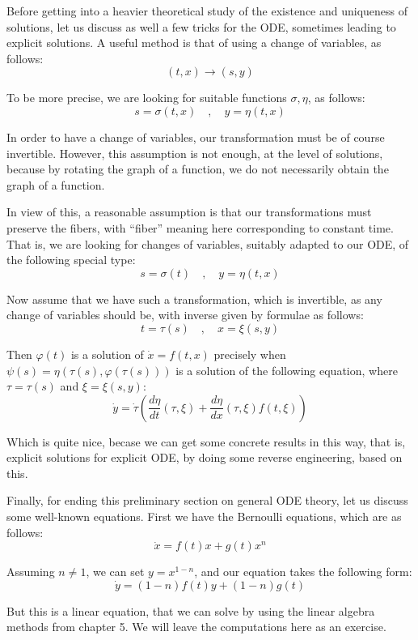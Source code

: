 \documentclass[12pt]{amsbook}
\begin{document}
Before getting into a heavier theoretical study of the existence and uniqueness of solutions, let us discuss as well a few tricks for the ODE, sometimes leading to explicit solutions. A useful method is that of using a change of variables, as follows:
$$(t,x)\to (s,y)$$

To be more precise, we are looking for suitable functions $\sigma,\eta$, as follows:
$$s=\sigma(t,x)\quad,\quad y=\eta(t,x)$$

In order to have a change of variables, our transformation must be of course invertible. However, this assumption is not enough, at the level of solutions, because by rotating the graph of a function, we do not necessarily obtain the graph of a function.

\bigskip

In view of this, a reasonable assumption is that our transformations must preserve the fibers, with ``fiber'' meaning here corresponding to constant time. That is, we are looking for changes of variables, suitably adapted to our ODE, of the following special type:
$$s=\sigma(t)\quad,\quad y=\eta(t,x)$$ 

Now assume that we have such a transformation, which is invertible, as any change of variables should be, with inverse given by formulae as follows:
$$t=\tau(s)\quad,\quad x=\xi(s,y)$$

Then $\varphi(t)$ is a solution of $\dot{x}=f(t,x)$ precisely when $\psi(s)=\eta(\tau(s),\varphi(\tau(s)))$ is a solution of the following equation, where $\tau=\tau(s)$ and $\xi=\xi(s,y)$:
$$\dot{y}=\dot{\tau}\left(\frac{d\eta}{dt}(\tau,\xi)+\frac{d\eta}{dx}(\tau,\xi)f(t,\xi)\right)$$

Which is quite nice, becase we can get some concrete results in this way, that is, explicit solutions for explicit ODE, by doing some reverse engineering, based on this.

\bigskip

Finally, for ending this preliminary section on general ODE theory, let us discuss some well-known equations. First we have the Bernoulli equations, which are as follows:
$$\dot{x}=f(t)x+g(t)x^n$$

Assuming $n\neq1$, we can set $y=x^{1-n}$, and our equation takes the following form:
$$\dot{y}=(1-n)f(t)y+(1-n)g(t)$$

But this is a linear equation, that we can solve by using the linear algebra methods from chapter 5. We will leave the computations here as an exercise.

\bigskip
\end{document}
